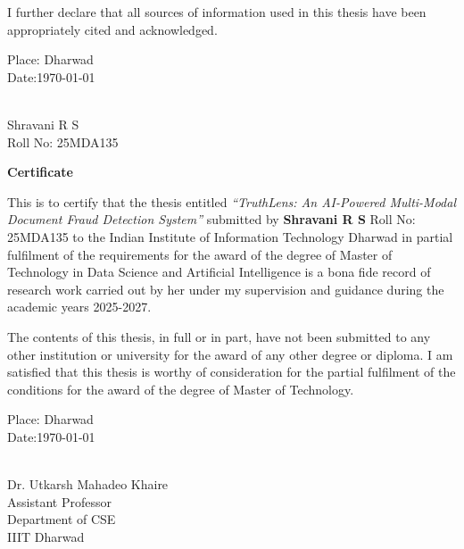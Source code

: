 \documentclass[12pt,a4paper,oneside]{report}
\begin{document}
\vspace{0.4cm}\noindent I further declare that all sources of information used
in this thesis have been appropriately cited and acknowledged.

\vspace{3cm}
\noindent\begin{minipage}[t]{0.45\textwidth}
Place: Dharwad\\[4pt]Date:\quad\today
\end{minipage}\hfill
\begin{minipage}[t]{0.45\textwidth}
\vspace{0.8cm}\hrulefill\\[2pt]Shravani R S\\{}Roll No: 25MDA135
\end{minipage}

\newpage\thispagestyle{plain}
\begin{center}{\Large\bfseries Certificate}\end{center}\vspace{0.8cm}
\noindent This is to certify that the thesis entitled \textit{``TruthLens:
An AI-Powered Multi-Modal Document Fraud Detection System''} submitted by
\textbf{Shravani R S} Roll No: 25MDA135 to the Indian Institute
of Information Technology Dharwad in partial fulfilment of the requirements
for the award of the degree of Master of Technology in Data Science and
Artificial Intelligence is a bona fide record of research work carried out
by her under my supervision and guidance during the academic years 2025-2027.

\vspace{0.4cm}\noindent The contents of this thesis, in full or in part, have
not been submitted to any other institution or university for the award of any
other degree or diploma. I am satisfied that this thesis is worthy of
consideration for the partial fulfilment of the conditions for the award of the
degree of Master of Technology.

\vspace{3cm}
\noindent\begin{minipage}[t]{0.45\textwidth}
Place: Dharwad\\[4pt]Date:\quad\today
\end{minipage}\hfill
\begin{minipage}[t]{0.45\textwidth}
\vspace{0.8cm}\hrulefill\\{}Dr. Utkarsh Mahadeo Khaire\\{}Assistant Professor\\{}Department of CSE\\{}IIIT Dharwad
\end{minipage}
\end{document}
